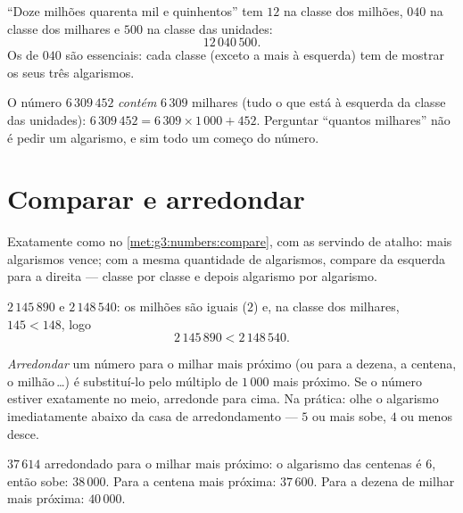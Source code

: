 \begin{example}\label{ex:g4:numbers:write}
``Doze milhões quarenta mil e quinhentos'' tem $12$ na classe dos
milhões, $040$ na classe dos milhares e $500$ na classe das
unidades:
\[
12\,040\,500 .
\]
Os  de $040$ são essenciais: cada classe (exceto a mais à
esquerda) tem de mostrar os seus três algarismos.
\end{example}

\begin{example}\label{ex:g4:numbers:contained}
O número $6\,309\,452$ \emph{contém} $6\,309$ milhares (tudo o que
está à esquerda da classe das unidades): $6\,309\,452 = 6\,309 \times
1\,000 + 452$. Perguntar ``quantos milhares'' não é pedir um
algarismo, e sim todo um começo do número.
\end{example}

\section{Comparar e arredondar}

\begin{method}\label{met:g4:numbers:compare}
Exatamente como no \cref{met:g3:numbers:compare}, com as 
servindo de atalho: mais algarismos vence; com a mesma quantidade de
algarismos, compare da esquerda para a direita --- classe por classe
e depois algarismo por algarismo.
\end{method}

\begin{example}\label{ex:g4:numbers:compare}
$2\,145\,890$ e $2\,148\,540$: os milhões são iguais ($2$) e, na
classe dos milhares, $145 < 148$, logo
\[
2\,145\,890 < 2\,148\,540 .
\]
\end{example}

\begin{definition}[Arredondamento]\label{def:g4:numbers:round}
\emph{Arredondar} um número para o milhar mais
próximo (ou para a dezena, a centena, o milhão\,\dots) é substituí-lo
pelo múltiplo de $1\,000$ mais próximo. Se o número estiver
exatamente no meio, arredonde para cima. Na prática: olhe o algarismo
imediatamente abaixo da casa de arredondamento --- $5$ ou mais sobe,
$4$ ou menos desce.
\end{definition}

\begin{example}\label{ex:g4:numbers:round}
$37\,614$ arredondado para o milhar mais próximo: o algarismo das
centenas é $6$, então sobe: $38\,000$. Para a centena mais próxima:
$37\,600$. Para a dezena de milhar mais próxima: $40\,000$.
\end{example}

